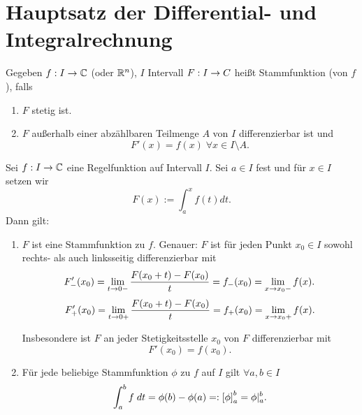 \documentclass[../ana2.tex]{subfiles}
\begin{document}
\setcounter{section}{4}
\section{Hauptsatz der Differential- und Integralrechnung}

\begin{defi}
    Gegeben \( \abb{f}{I}{\C} \) (oder \( \R^n \)), 
    \(I\) Intervall    
    \( \abb{F}{I}{C} \) heißt Stammfunktion (von \(f\)), falls
    \begin{enumerate}
        \item \(F\) stetig ist.
        \item \(F\) außerhalb einer abzählbaren Teilmenge 
        \( A \) von \( I \) differenzierbar ist und 
        \[ F'(x) = f(x) \; \forall x\in I \setminus A. \]
    \end{enumerate}
\end{defi} 
\begin{satz}
    Sei \( \abb{f}{I}{\C} \) eine Regelfunktion 
    auf Intervall \(I\). Sei \(a \in I\) fest und 
    für \( x\in I \) setzen wir 
    \[ F(x) := \int_a^x f(t) dt. \]
    Dann gilt: 
    \begin{enumerate}
        \item \(F\) ist eine Stammfunktion zu \(f\).
        Genauer: \( F \) ist für jeden Punkt 
        \( x_0 \in I \) sowohl rechts- als auch linksseitig 
        differenzierbar mit 
        \[ F'_-(x_0) = \limesx{t}{0-} 
        \frac{F(x_0 + t) - F(x_0)}{t} 
        = f_-(x_0) = \limesx{x}{x_0-} f(x). \]
        \[ F'_+(x_0) = \limesx{t}{0+} 
        \frac{F(x_0 + t) - F(x_0)}{t} 
        = f_+(x_0) = \limesx{x}{x_0+} f(x). \]
        
        Insbesondere ist \(F\) an jeder Stetigkeitsstelle 
        \( x_0 \) von \(F\) differenzierbar mit 
        \[ F'(x_0) = f(x_0). \]
        \item Für jede beliebige Stammfunktion \(\phi \) 
        zu \(f\) auf \(I\) gilt \( \forall a,b \in I \)
        \[ \integralx{f}{a}{b}{t} = \phi(b)-\phi(a) 
        =: \left[ \phi \right]^b_a = \phi \vert_a^b. \]
    \end{enumerate}
\end{satz}
\end{document}
